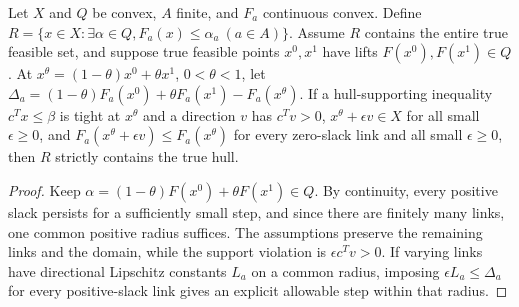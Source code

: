 \begin{proposition}\label{prop:psplit-repair}
Let $X$ and $Q$ be convex, $A$ finite, and $F_a$ continuous convex. Define
$R=\{x\in X:\exists\alpha\in Q,F_a(x)\le\alpha_a\ (a\in A)\}$.
Assume $R$ contains the entire true feasible set, and suppose true
feasible points $x^0,x^1$ have lifts $F(x^0),F(x^1)\in Q$.
At $x^\theta=(1-\theta)x^0+\theta x^1$, $0<\theta<1$, let
$\Delta_a=(1-\theta)F_a(x^0)+\theta F_a(x^1)-F_a(x^\theta)$.
If a hull-supporting inequality $c^Tx\le\beta$ is tight at $x^\theta$
and a direction $v$ has $c^Tv>0$, $x^\theta+\epsilon v\in X$ for all
small $\epsilon\ge0$, and
$F_a(x^\theta+\epsilon v)\le F_a(x^\theta)$ for every zero-slack link
and all small $\epsilon\ge0$, then $R$ strictly contains the true hull.
\end{proposition}
\begin{proof}
Keep $\alpha=(1-\theta)F(x^0)+\theta F(x^1)\in Q$. By continuity,
every positive slack persists for a sufficiently small step, and since
there are finitely many links, one common positive radius suffices. The
assumptions preserve the remaining links and the domain, while the
support violation is $\epsilon c^Tv>0$. If varying links have directional Lipschitz constants
$L_a$ on a common radius, imposing $\epsilon L_a\le\Delta_a$ for every
positive-slack link gives an explicit allowable step within that radius.
\end{proof}

